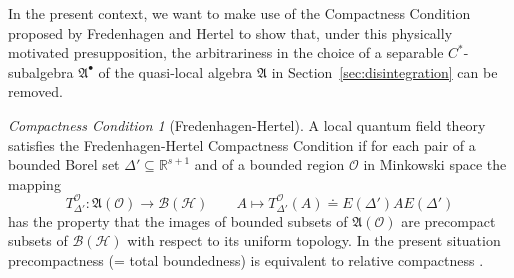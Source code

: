 \documentclass[a4paper,a4paper]{article}
\numberwithin{equation}{section}
\newcommand{\Afrak}{\mathfrak{A}}
\newcommand{\Oscr}{\mathscr{O}}
\newcommand{\Rsone}{\mathbb{R}^{s + 1}}
\newcommand{\BH}{\mathscr{B} ( \mathscr{H} )}
\newcommand{\EDprime}{E ( \Delta' )}
\newcommand{\AO}{\mathfrak{A} ( \mathscr{O} )}
\newcommand{\Abullet}{\mathfrak{A}^\bullet}
\newcommand{\TODprime}{T_{\Delta'}^\Oscr}
\theoremstyle{definition}
\theoremstyle{plain}
\theoremstyle{remark}
\theoremstyle{assumption}
\newtheorem{com}[definition]{Compactness Condition}
\begin{document}
  In the present context, we want to make use of the Compactness
  Condition proposed by Fredenhagen and Hertel to show that, under
  this physically motivated presupposition, the arbitrariness in the
  choice of a separable $C^*$-subalgebra $\Abullet$ of the quasi-local
  algebra $\Afrak$ in Section~\ref{sec:disintegration} can be removed.
  \begin{com}[Fredenhagen-Hertel]
    A local quantum field theory satisfies the Freden\-ha\-gen-Hertel
    Compactness Condition if for each pair of a bound\-ed Borel set
    $\Delta' \subseteq \Rsone$ and of a bounded region $\Oscr$ in
    Minkowski space the mapping
    \begin{equation*}
      \TODprime : \AO \rightarrow \BH \qquad A \mapsto \TODprime ( A )
      \doteq \EDprime A \EDprime
    \end{equation*}
    has the property that the images of bounded subsets of $\AO$ are
    precompact subsets of $\BH$ with respect to its uniform topology.
    In the present situation precompactness (= total boundedness) is
    equivalent to relative compactness \cite[Chapter~One,
    \S\,4,\,5.]{koethe:1983}.
  \end{com}
  
\end{document}
